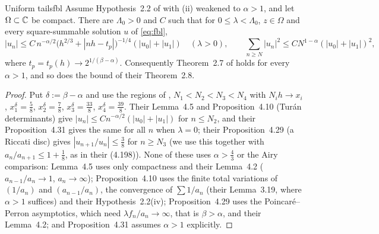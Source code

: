 \begin{theorem}{Uniform tails}{fbl}
Assume Hypothesis~2.2 of \cite{FBL2026} with (ii) weakened to $\alpha>1$, and let
$\Omega\subset\mathbb{C}$ be compact. There are $\Lambda_0>0$ and $C$ such that for $0\le\lambda<\Lambda_0$, $z\in\Omega$
and every square-summable solution $u$ of \eqref{eq:fbl},
\[
  |u_n|\le C\,n^{-\alpha/2}\bigl(h^{2/3}+|nh-t_p|\bigr)^{-1/4}(|u_0|+|u_1|)\quad(\lambda>0),\qquad
  \sum_{n\ge N}|u_n|^2\le CN^{1-\alpha}(|u_0|+|u_1|)^2,
\]
where $t_p=t_p(h)\to2^{1/(\beta-\alpha)}$. Consequently Theorem~2.7 of \cite{FBL2026} holds for every
$\alpha>1$, and so does the bound of their Theorem~2.8.
\end{theorem}

\begin{proof}
 Put $\delta:=\beta-\alpha$ and use the regions of
\cite[Def.~4.1, Lemma~4.2]{FBL2026}, $N_1<N_2<N_3<N_4$ with $N_ih\to x_i$,
$x_1^\delta=\frac58$, $x_2^\delta=\frac78$, $x_3^\delta=\frac{33}8$, $x_4^\delta=\frac{39}8$. Their Lemma~4.5 and
Proposition~4.10 (Tur\'an determinants) give $|u_n|\le Cn^{-\alpha/2}(|u_0|+|u_1|)$ for
$n\le N_2$, and their Proposition~4.31 gives the same for all $n$ when $\lambda=0$; their
Proposition~4.29 (a Riccati disc) gives $|u_{n+1}/u_n|\le\frac38$ for $n\ge N_3$ (we use this together
with $a_n/a_{n+1}\le1+\frac18$, as in their (4.198)). None of these uses $\alpha>\frac43$ or the Airy
comparison: Lemma~4.5 uses only compactness and their Lemma~4.2 ($a_{n-1}/a_n\to1$, $a_n\to\infty$);
Proposition~4.10 uses the finite total variations of $(1/a_n)$ and $(a_{n-1}/a_n)$, the convergence of
$\sum1/a_n$ (their Lemma~3.19, where $\alpha>1$ suffices) and their Hypothesis~2.2(iv); Proposition~4.29 uses
the Poincar\'e--Perron asymptotics, which need $\lambda f_n/a_n\to\infty$, that is $\beta>\alpha$, and their
Lemma~4.2; and Proposition~4.31 assumes $\alpha>1$ explicitly.


\end{proof}
